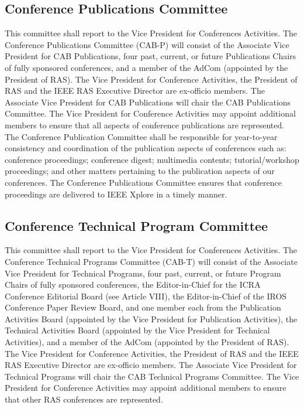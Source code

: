 \documentclass[10pt]{article}
\begin{document}
\subsection{Conference Publications Committee}

This committee shall report to the Vice President for Conferences Activities. The Conference Publications Committee (CAB-P) will consist of the Associate Vice President for CAB Publications, four past, current, or future Publications Chairs of fully sponsored conferences, and a member of the AdCom (appointed by the President of RAS). The Vice President for Conference Activities, the President of RAS and the IEEE RAS Executive Director are ex-officio members. The Associate Vice President for CAB Publications will chair the CAB Publications Committee. The Vice President for Conference Activities may appoint additional members to ensure that all aspects of conference publications are represented. The Conference Publication Committee shall be responsible for year-to-year consistency and coordination of the publication aspects of conferences such as: conference proceedings; conference digest; multimedia contents; tutorial/workshop proceedings; and other matters pertaining to the publication aspects of our conferences. The Conference Publications Committee ensures that conference proceedings are delivered to IEEE Xplore in a timely manner.



\subsection{Conference Technical Program Committee}
This committee shall report to the Vice President for Conferences Activities. The Conference Technical Programs Committee (CAB-T) will consist of the Associate Vice President for Technical Programs, four past, current, or future Program Chairs of fully sponsored conferences, the Editor-in-Chief for the ICRA Conference Editorial Board (see Article VIII), the Editor-in-Chief of the IROS Conference Paper Review Board, and one member each from the Publication Activities Board (appointed by the Vice President for Publication Activities), the Technical Activities Board (appointed by the Vice President for Technical Activities), and a member of the AdCom (appointed by the President of RAS).  The Vice President for Conference Activities, the President of RAS and the IEEE RAS Executive Director are ex-officio members. The Associate Vice President for Technical Programs will chair the CAB Technical Programs Committee. The Vice President for Conference Activities may appoint additional members to ensure that other RAS conferences are represented.
\end{document}
